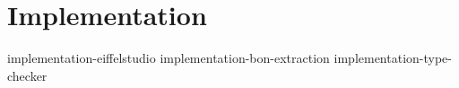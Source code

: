 \chapter{Implementation}
{implementation-eiffelstudio}
{implementation-bon-extraction}
{implementation-type-checker}